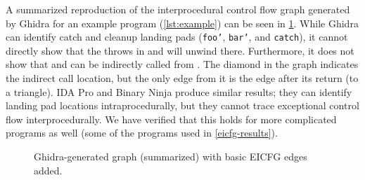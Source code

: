 A summarized reproduction of the interprocedural control flow graph
generated by Ghidra for an example program (\cref{lst:example}) can be seen in \cref{fig:ghidra-example}.
While Ghidra can identify catch and cleanup landing pads (\texttt{foo'}, \texttt{bar'}, and \texttt{catch}), it cannot directly show that the throws in  and  will unwind there.
Furthermore, it does not show that  and  can be indirectly called from .
The diamond in the graph indicates the indirect call location, but the only edge from it is the edge after its return (to a triangle).
IDA Pro and Binary Ninja produce similar results; they can identify landing pad locations intraprocedurally, but they cannot trace exceptional control flow interprocedurally.
We have verified that this holds for more complicated programs as well (some of the programs used in \cref{eicfg-results}).

\begin{figure}
  \centering
  \caption{Ghidra-generated graph (summarized) with basic EICFG edges added.}\label{fig:ghidra-example}
\end{figure}

